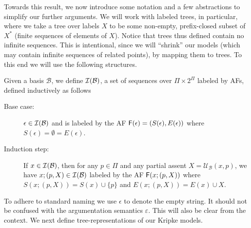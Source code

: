 \documentclass{llncs}
\newcommand{\iterate}[1]{{\cal I}(#1)}
\newcommand{\update}[3]{{\mathcal U}_{#1}(#2,#3)}
\newcommand{\af}{{\sf F}}
\newcommand{\views}{\mathcal B}
\newcommand{\sem}{\varepsilon}
\begin{document}
Towards this result, we now introduce some notation and a few abstractions to simplify our further arguments. We will work with labeled trees, in particular, where we take a tree over labels $X$ to be some
 non-empty, prefix-closed subset of $X^*$ (finite sequences of elements of $X$). Notice that trees thus defined contain no infinite sequences. This is intentional, since we will ``shrink'' our models (which may contain infinite sequences of related points), by mapping them to trees. To this end we will use the following structures. 

\begin{definition}\label{def:iaf} Given a basis $\views$, we define $\iterate \views$, a set of sequences over $\Pi \times 2^\Pi$ labeled by AFs, defined inductively as follows
\begin{description}
\item [Base case:] $\epsilon \in \iterate \views$ and is labeled by the AF $\af(\epsilon) = (S(\epsilon),E(\epsilon))$ where $S(\epsilon) = \emptyset = E(\epsilon)$.
\item [Induction step:] If $x \in \iterate \views$, then for any $p \in \Pi$ and any partial assent $X = \update \views x p$, we have $x;(p, X) \in \iterate \views$ labeled by the AF $\af(x;(p,X))$ where $S(x;(p, X)) = S(x) \cup \{p\}$ and $E(x;(p, X)) = E(x) \cup X$.
\end{description}
\end{definition}
To adhere to standard naming we use $\epsilon$ to denote the empty string. It should not be confused with the argumentation semantics $\sem$. This will also be clear from the context.
We next define tree-representations of our Kripke models.
\end{document}
